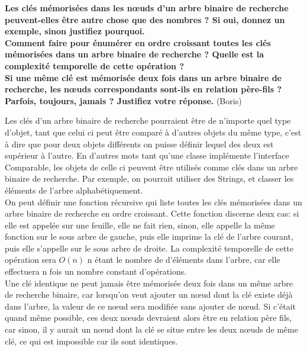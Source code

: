 \textbf{Les clés mémorisées dans les nœuds d'un arbre binaire de recherche peuvent-elles être autre chose que des nombres ? Si oui, donnez un exemple, sinon justifiez pourquoi. \\
Comment faire pour énumérer en ordre croissant toutes les clés mémorisées dans un arbre binaire de recherche ? Quelle est la complexité temporelle de cette opération ? \\
Si une même clé est mémorisée deux fois dans un arbre binaire de recherche, les nœuds correspondants sont-ils en relation père-fils ? Parfois, toujours, jamais ? Justifiez votre réponse.} (Boris)

Les clés d'un arbre binaire de recherche pourraient être de n'importe quel type d'objet, tant que celui ci peut être comparé à d'autres objets du même type, c'est à dire que pour deux objets différents on puisse définir lequel des deux est supérieur à l'autre. En d'autres mots tant qu'une classe implémente l'interface Comparable, les objets de celle ci peuvent être utilisés comme clés dans un arbre binaire de recherche. Par exemple, on pourrait utiliser des Strings, et classer les éléments de l'arbre alphabétiquement.\\
On peut définir une fonction récursive qui liste toutes les clés mémorisées dans un arbre binaire de recherche en ordre croissant. Cette fonction discerne deux cas: si elle est appelée sur une feuille, elle ne fait rien, sinon, elle appelle la même fonction sur le sous arbre de gauche, puis elle imprime la clé de l'arbre courant, puis elle s'appelle sur le sous arbre de droite. La complexité temporelle de cette opération sera $O(n)$ n étant le nombre de d'éléments dans l'arbre, car elle effectuera n fois un nombre constant d'opérations.\\
Une clé identique ne peut jamais être mémorisée deux fois dans un même arbre de recherche binaire, car lorsqu'on veut ajouter un nœud dont la clé existe déjà dans l'arbre, la valeur de ce nœud sera modifiée sans ajouter de nœud. Si c'était quand même possible, ces deux nœuds devraient alors être en relation père fils, car sinon, il y aurait un nœud dont la clé se situe entre les deux nœuds de même  clé, ce qui est impossible car ils sont identiques.